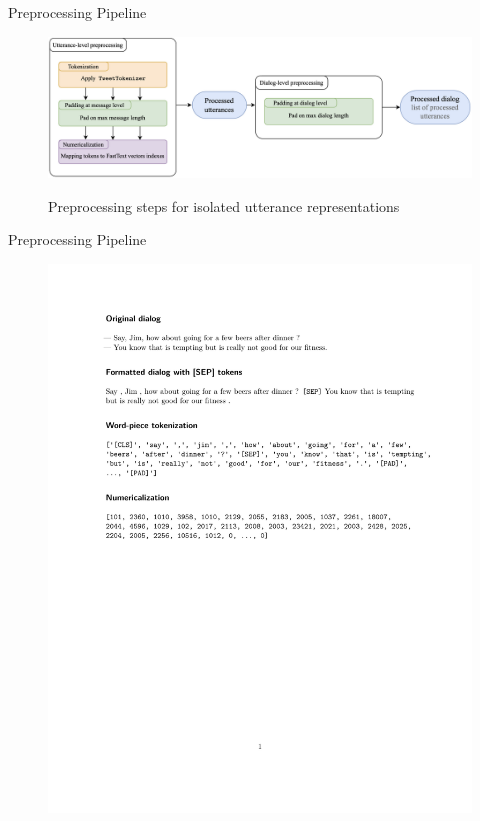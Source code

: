 \documentclass[11pt,aspectratio=169]{beamer}
\begin{document}
    \begin{frame}{Preprocessing Pipeline}
        \begin{figure}
        \centering
        \includegraphics[width=\textwidth]{figures/preproc_static2.png}
        \label{fig:preproc_pipeline_isolated2}
        \caption{\centering Preprocessing steps for isolated utterance representations}
    \end{figure}
    \end{frame}
    
    \begin{frame}{Preprocessing Pipeline}
        \begin{figure}
        \centering
        \includegraphics[scale=0.56]{figures/bert-output-simple.pdf}
        \label{fig:preproc_context_example4}
    \end{figure}
    \end{frame}
    
\end{document}
